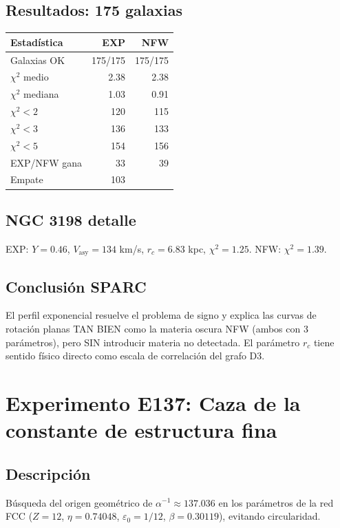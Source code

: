 \documentclass[12pt]{article}
\begin{document}
\subsection{Resultados: 175 galaxias}
\begin{center}
\begin{tabular}{lrr}
\toprule
Estad\'istica & EXP & NFW \\
\midrule
Galaxias OK & 175/175 & 175/175 \\
$\chi^2$ medio & 2.38 & 2.38 \\
$\chi^2$ mediana & 1.03 & 0.91 \\
$\chi^2 < 2$ & 120 & 115 \\
$\chi^2 < 3$ & 136 & 133 \\
$\chi^2 < 5$ & 154 & 156 \\
EXP/NFW gana & 33 & 39 \\
Empate & 103 & \\
\bottomrule
\end{tabular}
\end{center}

\subsection{NGC 3198 detalle}
EXP: $Y=0.46$, $V_{\text{asy}}=134$ km/s, $r_c=6.83$ kpc, $\chi^2=1.25$. NFW: $\chi^2=1.39$.

\subsection{Conclusi\'on SPARC}
El perfil exponencial resuelve el problema de signo y explica las curvas de rotaci\'on planas TAN BIEN como la materia oscura NFW (ambos con 3 par\'ametros), pero SIN introducir materia no detectada. El par\'ametro $r_c$ tiene sentido f\'isico directo como escala de correlaci\'on del grafo D3.

\section{Experimento E137: Caza de la constante de estructura fina}

\subsection{Descripci\'on}
B\'usqueda del origen geom\'etrico de $\alpha^{-1} \approx 137.036$ en los par\'ametros de la red FCC ($Z=12$, $\eta=0.74048$, $\varepsilon_0=1/12$, $\beta=0.30119$), evitando circularidad.
\end{document}
